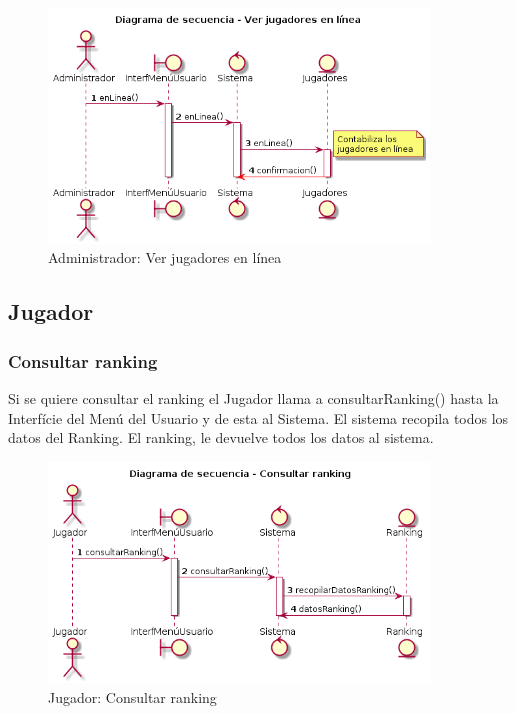 \begin{figure}[ht]
 \centering
 	  \includegraphics[width=0.9\textwidth]{./imatges/administrador/Ver_usuarios_en_linea.png}
 \caption{Administrador: Ver jugadores en línea}
 \end{figure}


\newpage
\subsection{Jugador}\label{sec:uc0}
\subsubsection{Consultar ranking}
  Si se quiere consultar el ranking el Jugador llama a consultarRanking() hasta la Interfície del Menú del Usuario y de esta al Sistema. El sistema recopila todos los datos del Ranking. El ranking, le devuelve todos los datos al sistema.
  
\begin{figure}[ht]
 \centering
 	  \includegraphics[width=0.9\textwidth]{./imatges/jugador/Consultar_ranking.png}
 \caption{Jugador: Consultar ranking}
 \end{figure}
    
